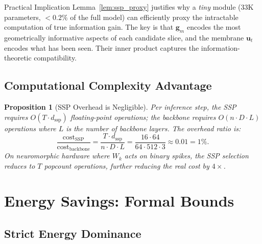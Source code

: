 \documentclass[11pt,a4paper]{article}
\newtheorem{proposition}[theorem]{Proposition}
\newcommand{\bu}{\mathbf{u}}
\newcommand{\bg}{\mathbf{g}}
\begin{document}
\begin{insightbox}{Practical Implication}
Lemma~\ref{lem:ssp_proxy} justifies why a \emph{tiny} module (33K parameters,
$<0.2\%$ of the full model) can efficiently proxy the intractable computation of
true information gain.  The key is that $\bg_m$ encodes the most geometrically
informative aspects of each candidate slice, and the membrane $\bu_t$ encodes what
has been seen.  Their inner product captures the information-theoretic compatibility.
\end{insightbox}

\subsection{Computational Complexity Advantage}

\begin{proposition}[SSP Overhead is Negligible]
\label{prop:complexity}
Per inference step, the SSP requires $O(T \cdot d_\mathrm{ssp})$ floating-point
operations; the backbone requires $O(n \cdot D \cdot L)$ operations where $L$ is
the number of backbone layers.  The overhead ratio is:
\[
  \frac{\mathrm{cost}_\mathrm{SSP}}{\mathrm{cost}_\mathrm{backbone}}
  = \frac{T \cdot d_\mathrm{ssp}}{n \cdot D \cdot L}
  = \frac{16 \cdot 64}{64 \cdot 512 \cdot 3}
  \approx 0.01 = 1\%.
\]
On neuromorphic hardware where $W_k$ acts on binary spikes, the SSP selection
reduces to $T$ \emph{popcount} operations, further reducing the real cost by $4\times$.
\end{proposition}

\section{Energy Savings: Formal Bounds}

\subsection{Strict Energy Dominance}
\end{document}
